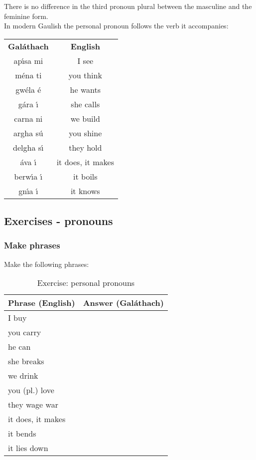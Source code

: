 There is no difference in the third pronoun plural between the masculine and the feminine form.\\

In modern Gaulish the personal pronoun follows the verb it accompanies:
\begin{table}[H]
\centering
\begin{tabular}{cc}
  \toprule
  \textbf{Gal\'{a}thach} & \textbf{English}\\
  \cmidrule(lr){1-1}\cmidrule{2-2}
  ap\'{\i}sa mi & I see\\
  m\'{e}na ti & you think\\
  gw\'{e}la \'{e} & he wants\\
  g\'{a}ra \'{\i} & she calls\\
  carna ni & we build\\
  argha s\'{u} & you shine\\
  delgha s\'{\i} & they hold\\
  \'{a}va \'{\i} & it  does, it makes\\
  berw\'{\i}a \'{\i} & it boils\\
  gn\'{\i}a \'{\i} & it knows\\
  \bottomrule
\end{tabular}
\label{examples_personal_pronoun}
\end{table}

\newpage
\subsection{Exercises - pronouns}

\subsubsection{Make phrases}

Make the following phrases:\\
\begin{table}[H]
\centering
\begin{tabular}{|l|M{10.0cm}|}
  \toprule
  \textbf{Phrase (English)} & \textbf{Answer (Gal\'{a}thach)}\\
  \toprule
  I buy & \\
  \midrule
  you carry & \\
  \midrule
  he can & \\
  \midrule
  she breaks & \\
  \midrule
  we drink & \\
  \midrule
  you (pl.) love & \\
  \midrule
  they wage war & \\
  \midrule
  it does, it makes & \\
  \midrule
  it bends & \\
  \midrule
  it lies down & \\
  \bottomrule
\end{tabular}
\label{exercise_personal_pronouns}
\caption{Exercise: personal pronouns}
\end{table}

